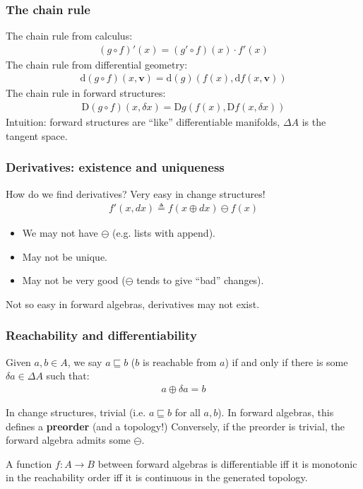 \documentclass[english]{beamer}
\theoremstyle{plain}
\theoremstyle{remark}
\theoremstyle{remark}
\theoremstyle{remark}
\theoremstyle{definition}
\theoremstyle{definition}
\newcommand{\ra}[0]{\rightarrow}
\newcommand{\defeq}[0]{\triangleq}
\newcommand{\rleq}[0]{\sqsubseteq}
\newcommand{\diff}[0]{\text{d}}
\newcommand{\D}[0]{\text{D}}
\begin{document}
\begin{frame}
  \frametitle{The chain rule}
  The chain rule from calculus:
  \begin{align*}
    (g \circ f)'(x) = (g' \circ f) (x) \cdot f'(x)
  \end{align*}
  \vfill
  The chain rule from differential geometry:
  \begin{align*}
    \diff(g \circ f)(x, \textbf{v}) = \diff(g) (f(x), \diff f(x, \textbf{v}))
  \end{align*}
  \vfill
  The chain rule in forward structures:
  \begin{align*}
    \D(g \circ f)(x, \delta x) = \D g(f(x), \D f(x, \delta x))
  \end{align*}
  \vfill
  Intuition: forward structures are ``like'' differentiable manifolds, $\Delta A$ is
  the tangent space.
\end{frame}

\begin{frame}
  \frametitle{Derivatives: existence and uniqueness}
  How do we find derivatives?
  \vfill
  Very easy in change structures!
  \begin{align*}
    f'(x, dx) \defeq f(x \oplus dx) \ominus f(x)
  \end{align*}
  \begin{itemize}
    \item We may not have $\ominus$ (e.g. lists with append).
    \item May not be unique.
    \item May not be very good ($\ominus$ tends to give ``bad'' changes).
  \end{itemize}
  \vfill
  Not so easy in forward algebras, derivatives may not exist.
\end{frame}

\begin{frame}
  \frametitle{Reachability and differentiability}
  \begin{definition}
    Given $a, b \in A$, we say $a \rleq b$ ($b$ is reachable from $a$) if and only if there
    is some $\delta a \in \Delta A$ such that:
    \begin{align*}
      a \oplus \delta a = b
    \end{align*}
  \end{definition}
  \vfill
  In change structures, trivial (i.e. $a \rleq b$ for all $a, b$).
  \vfill
  In forward algebras, this defines a \textbf{preorder} (and a topology!)
  Conversely, if the preorder is trivial, the forward algebra admits some $\ominus$.
  \begin{lemma}
    A function $f : A \ra B$ between forward algebras is differentiable iff it is monotonic in
    the reachability order iff
    it is continuous in the generated topology.
  \end{lemma}
\end{frame}
\end{document}
